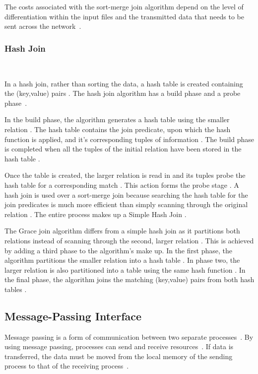 \documentclass[12pt,twocolumn]{witseiepaper}
\begin{document}
The costs associated with the sort-merge join algorithm depend on the level of differentiation within the input files and the transmitted data that needs to be sent across the network~\cite{dist}.

\subsubsection{Hash Join}$    $

In a hash join, rather than sorting the data, a hash table is created containing the (key,value) pairs \cite{thomas_zurek_optimisation_1997}. The hash join algorithm has a build phase and a probe phase~\cite{equijoin}. 

In the build phase, the algorithm generates a hash table using the smaller relation \cite{evaluating4JoinAlgorithms}. The hash table contains the join predicate, upon which the hash function is applied, and it's corresponding tuples of information \cite{thomas_zurek_optimisation_1997, evaluating4JoinAlgorithms}. The build phase is completed when all the tuples of the initial relation have been stored in the hash table \cite{thomas_zurek_optimisation_1997}. 

Once the table is created, the larger relation is read in and its tuples probe the hash table for a corresponding match \cite{thomas_zurek_optimisation_1997}. This action forms the probe stage \cite{evaluating4JoinAlgorithms}. A hash join is used over a sort-merge join because searching the hash table for the join predicates is much more efficient than simply scanning through the original relation \cite{evaluating4JoinAlgorithms}. The entire process makes up a Simple Hash Join \cite{evaluating4JoinAlgorithms}. 

The Grace join algorithm differs from a simple hash join as it partitions both relations instead of scanning through the second, larger relation \cite{graceHash}. This is achieved by adding a third phase to the algorithm's make up. In the first phase, the algorithm partitions the smaller relation into a hash table \cite{graceHash}. In phase two, the larger relation is also partitioned into a table using the same hash function \cite{evaluating4JoinAlgorithms}. In the final phase, the algorithm joins the matching (key,value) pairs from both hash tables \cite{evaluating4JoinAlgorithms}.

\subsection{Message-Passing Interface}
Message passing is a form of communication between two separate processes~\cite{IBM, equijoinWithMPI}. By using message passing, processes can send and receive resources~\cite{IBM}. If data is transferred, the data must be moved from the local memory of the sending process to that of the receiving process~\cite{IBM}.
\end{document}
